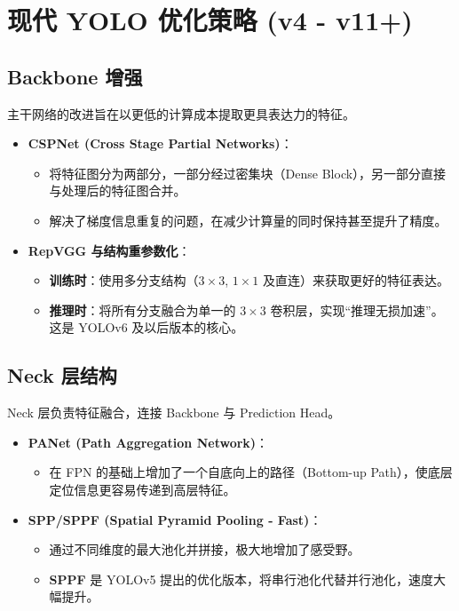\documentclass[11pt,a4paper]{article}
\begin{document}

\section{现代 YOLO 优化策略 (v4 - v11+)}

\subsection{Backbone 增强}
主干网络的改进旨在以更低的计算成本提取更具表达力的特征。
\begin{itemize}
    \item \textbf{CSPNet (Cross Stage Partial Networks)}：
    \begin{itemize}
        \item 将特征图分为两部分，一部分经过密集块（Dense Block），另一部分直接与处理后的特征图合并。
        \item 解决了梯度信息重复的问题，在减少计算量的同时保持甚至提升了精度。
    \end{itemize}
    \item \textbf{RepVGG 与结构重参数化}：
    \begin{itemize}
        \item \textbf{训练时}：使用多分支结构（$3 \times 3$, $1 \times 1$ 及直连）来获取更好的特征表达。
        \item \textbf{推理时}：将所有分支融合为单一的 $3 \times 3$ 卷积层，实现“推理无损加速”。这是 YOLOv6 及以后版本的核心。
    \end{itemize}
\end{itemize}



\subsection{Neck 层结构}
Neck 层负责特征融合，连接 Backbone 与 Prediction Head。
\begin{itemize}
    \item \textbf{PANet (Path Aggregation Network)}：
    \begin{itemize}
        \item 在 FPN 的基础上增加了一个自底向上的路径（Bottom-up Path），使底层定位信息更容易传递到高层特征。
    \end{itemize}
    \item \textbf{SPP/SPPF (Spatial Pyramid Pooling - Fast)}：
    \begin{itemize}
        \item 通过不同维度的最大池化并拼接，极大地增加了感受野。
        \item \textbf{SPPF} 是 YOLOv5 提出的优化版本，将串行池化代替并行池化，速度大幅提升。
    \end{itemize}
\end{itemize}
\end{document}
